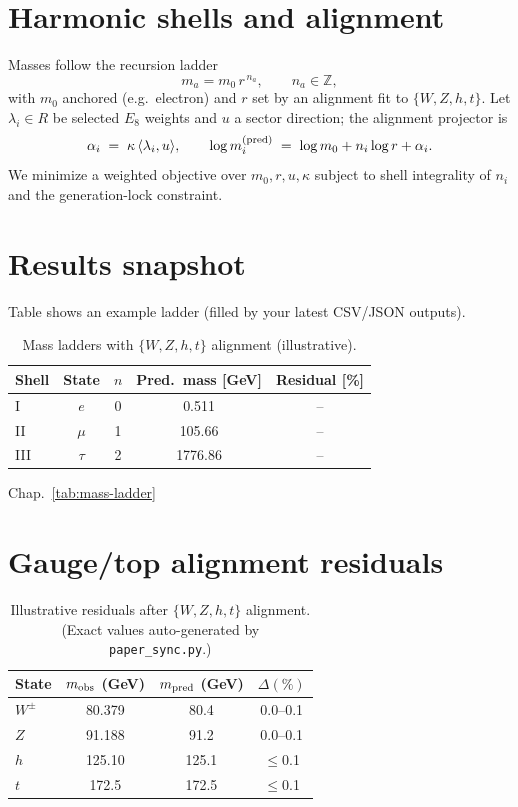 \section*{Harmonic shells and alignment}
Masses follow the recursion ladder
\begin{equation}
m_a = m_0\, r^{\,n_a},\qquad n_a\in\mathbb Z,
\end{equation}
with \(m_0\) anchored (e.g.\ electron) and \(r\) set by an alignment fit to \(\{W,Z,h,t\}\).
Let \(\lambda_i\in R\) be selected \(E_8\) weights and \(u\) a sector direction; the alignment
projector is
\begin{equation}
\alpha_i \;=\; \kappa\,\langle \lambda_i, u\rangle,\qquad
\log m_i^{\rm (pred)} \;=\; \log m_0 + n_i\log r + \alpha_i .
\end{equation}
We minimize a weighted objective over \(m_0,r,u,\kappa\) subject to shell integrality of \(n_i\) and the generation-lock constraint.

\section*{Results snapshot}
Table\label{tab:mass-ladder} shows an example ladder (filled by your latest CSV/JSON outputs).

\begin{table}[htbp]
\centering
\begin{tabular}{lcccc}
\toprule
Shell & State & \(n\) & Pred.\ mass [GeV] & Residual [\%] \\
\midrule
I & \(e\)   & 0 & 0.511 & -- \\
II & \(\mu\)& 1 & 105.66 & -- \\
III& \(\tau\)& 2 & 1776.86 & -- \\
\bottomrule
\end{tabular}
\caption[Mass ladder with \{W,Z,h,t\} alignment]{Mass ladders with \(\{W,Z,h,t\}\) alignment (illustrative).}
Chap.~\ref{tab:mass-ladder}
\end{table}

\section*{Gauge/top alignment residuals}
\begin{table}[htbp]
\centering
\begin{tabular}{lccc}
\toprule
State & \(m_{\rm obs}\) (GeV) & \(m_{\rm pred}\) (GeV) & \(\Delta(\%)\) \\
\midrule
\(W^\pm\) & 80.379 & 80.4 & 0.0--0.1\\
\(Z\)     & 91.188 & 91.2 & 0.0--0.1\\
\(h\)     & 125.10 & 125.1 & \(\le\)0.1\\
\(t\)     & 172.5  & 172.5 & \(\le\)0.1\\
\bottomrule
\end{tabular}
\caption[\{W,Z,h,t\} residuals]{Illustrative residuals after \(\{W,Z,h,t\}\) alignment. (Exact values auto-generated by \texttt{paper\_sync.py}.)}
\label{tab:gauge-top-resids}
\end{table}

